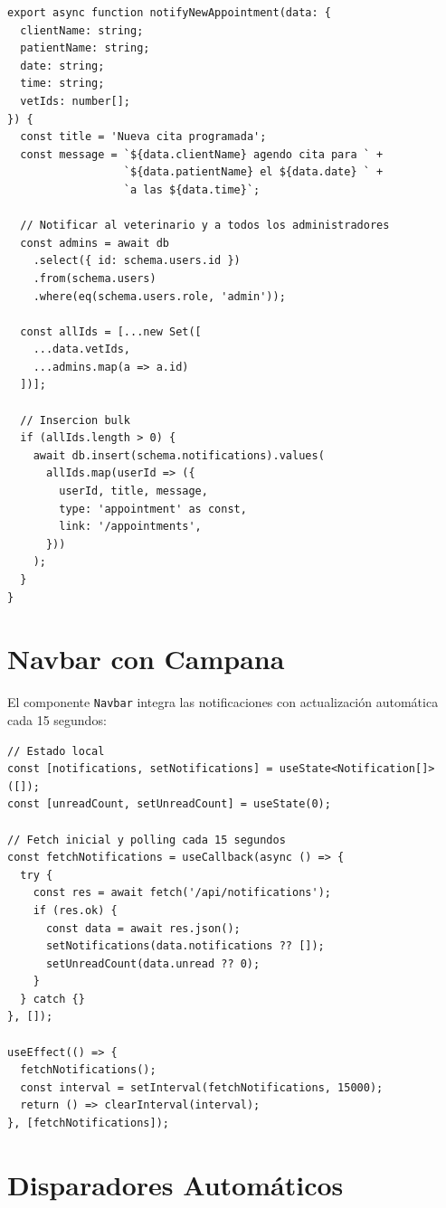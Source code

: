 \begin{lstlisting}[style=typescript, caption=notifyNewAppointment]
export async function notifyNewAppointment(data: {
  clientName: string;
  patientName: string;
  date: string;
  time: string;
  vetIds: number[];
}) {
  const title = 'Nueva cita programada';
  const message = `${data.clientName} agendo cita para ` +
                  `${data.patientName} el ${data.date} ` +
                  `a las ${data.time}`;

  // Notificar al veterinario y a todos los administradores
  const admins = await db
    .select({ id: schema.users.id })
    .from(schema.users)
    .where(eq(schema.users.role, 'admin'));

  const allIds = [...new Set([
    ...data.vetIds,
    ...admins.map(a => a.id)
  ])];

  // Insercion bulk
  if (allIds.length > 0) {
    await db.insert(schema.notifications).values(
      allIds.map(userId => ({
        userId, title, message,
        type: 'appointment' as const,
        link: '/appointments',
      }))
    );
  }
}
\end{lstlisting}

\section{Navbar con Campana}

El componente \texttt{Navbar} integra las notificaciones con actualizaci\'on
autom\'atica cada 15 segundos:

\begin{lstlisting}[style=typescript, caption=Navbar - Polling de notificaciones]
// Estado local
const [notifications, setNotifications] = useState<Notification[]>([]);
const [unreadCount, setUnreadCount] = useState(0);

// Fetch inicial y polling cada 15 segundos
const fetchNotifications = useCallback(async () => {
  try {
    const res = await fetch('/api/notifications');
    if (res.ok) {
      const data = await res.json();
      setNotifications(data.notifications ?? []);
      setUnreadCount(data.unread ?? 0);
    }
  } catch {}
}, []);

useEffect(() => {
  fetchNotifications();
  const interval = setInterval(fetchNotifications, 15000);
  return () => clearInterval(interval);
}, [fetchNotifications]);
\end{lstlisting}

\section{Disparadores Autom\'aticos}

